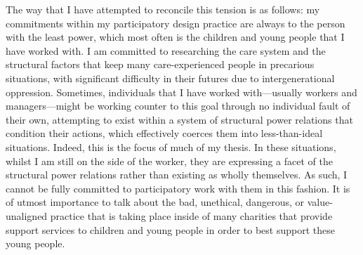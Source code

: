The way that I have attempted to reconcile this tension is as follows: my commitments within my participatory design practice are always to the person with the least power, which most often is the children and young people that I have worked with. I am committed to researching the care system and the structural factors that keep many care-experienced people in precarious situations, with significant difficulty in their futures due to intergenerational oppression. Sometimes, individuals that I have worked with—usually workers and managers—might be working counter to this goal through no individual fault of their own, attempting to exist within a system of structural power relations that condition their actions, which effectively coerces them into less-than-ideal situations. Indeed, this is the focus of much of my thesis. In these situations, whilst I am still on the side of the worker, they are expressing a facet of the structural power relations rather than existing as wholly themselves. As such, I cannot be fully committed to participatory work with them in this fashion. It is of utmost importance to talk about the bad, unethical, dangerous, or value-unaligned practice that is taking place inside of many charities that provide support services to children and young people in order to best support these young people.

